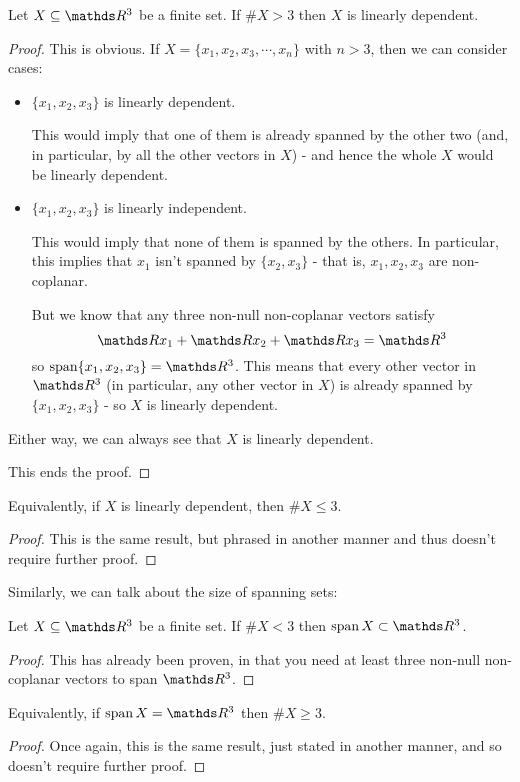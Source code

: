 \begin{lemma}
	Let $X\subseteq \R^3$ be a finite set. If $\# X>3$ then $X$ is linearly dependent.
\end{lemma}
\begin{proof}
	This is obvious. If $X=\{x_1,x_2,x_3,\cdots,x_n\}$ with $n>3$, then we can consider cases:
	
	\begin{itemize}
		\item $\{x_1,x_2,x_3\}$ is linearly dependent.
		
		This would imply that one of them is already spanned by the other two (and, in particular, by all the other vectors in $X$) - and hence the whole $X$ would be linearly dependent.
		
		\item $\{x_1,x_2,x_3\}$ is linearly independent.
		
		This would imply that none of them is spanned by the others. In particular, this implies that $x_1$ isn't spanned by $\{x_2,x_3\}$ - that is, $x_1,x_2,x_3$ are non-coplanar.
		
		But we know that any three non-null non-coplanar vectors satisfy
		\[\R x_1+\R x_2+\R x_3=\R^3\]so $\spen\{x_1,x_2,x_3\}=\R^3$. This means that every other vector in $\R^3$ (in particular, any other vector in $X$) is already spanned by $\{x_1,x_2,x_3\}$ - so $X$ is linearly dependent.
	\end{itemize}

Either way, we can always see that $X$ is linearly dependent.

This ends the proof.
\end{proof}
\begin{cor}
	Equivalently, if $X$ is linearly dependent, then $\#X\leq 3$.
\end{cor}
\begin{proof}
	This is the same result, but phrased in another manner and thus doesn't require further proof.
\end{proof}

Similarly, we can talk about the size of spanning sets:

\begin{lemma}
	Let $X\subseteq\R^3$ be a finite set. If $\#X<3$ then $\spen X\subset\R^3$.
\end{lemma}
\begin{proof}
	This has already been proven, in that you need at least three non-null non-coplanar vectors to span $\R^3$.
\end{proof}
\begin{cor}
	Equivalently, if $\spen X=\R^3$ then $\#X\geq 3$.
\end{cor}
\begin{proof}
	Once again, this is the same result, just stated in another manner, and so doesn't require further proof.
\end{proof}

